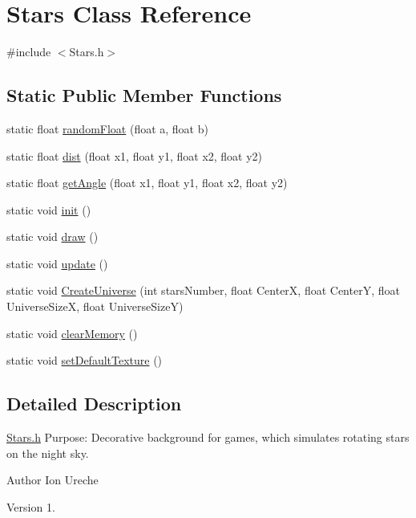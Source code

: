 \hypertarget{class_stars}{}\section{Stars Class Reference}
\label{class_stars}


{\ttfamily \#include $<$Stars.\+h$>$}

\subsection*{Static Public Member Functions}
\begin{DoxyCompactItemize}
\item 
static float \hyperlink{class_stars_a61b9454a421728f686e45a209132f436}{random\+Float} (float a, float b)
\item 
static float \hyperlink{class_stars_ac4a7365be8cf875ea226ed5cac1e7d9d}{dist} (float x1, float y1, float x2, float y2)
\item 
static float \hyperlink{class_stars_a521a6c68db4d742ba3f2cfcce20281fd}{get\+Angle} (float x1, float y1, float x2, float y2)
\item 
static void \hyperlink{class_stars_ad508110016be8c071307f78ca7d38b82}{init} ()
\item 
static void \hyperlink{class_stars_a79c2bc6f201c4d8967b03ccb987b23a6}{draw} ()
\item 
static void \hyperlink{class_stars_aa92aca9a4ad38ae23d57074b7825e732}{update} ()
\item 
static void \hyperlink{class_stars_ae3eceb58ea18fc3c8fde7be2e2ec3d2c}{Create\+Universe} (int stars\+Number, float Center\+X, float Center\+Y, float Universe\+Size\+X, float Universe\+Size\+Y)
\item 
static void \hyperlink{class_stars_a7c8377a806b771ffcaa9fa203b126796}{clear\+Memory} ()
\item 
static void \hyperlink{class_stars_a452bc9ed3721c5c3e51c19fe710ef18e}{set\+Default\+Texture} ()
\end{DoxyCompactItemize}


\subsection{Detailed Description}
\hyperlink{_stars_8h_source}{Stars.\+h} Purpose\+: Decorative background for games, which simulates rotating stars on the night sky.

\begin{DoxyAuthor}{Author}
Ion Ureche 
\end{DoxyAuthor}
\begin{DoxyVersion}{Version}
1. 
\end{DoxyVersion}



